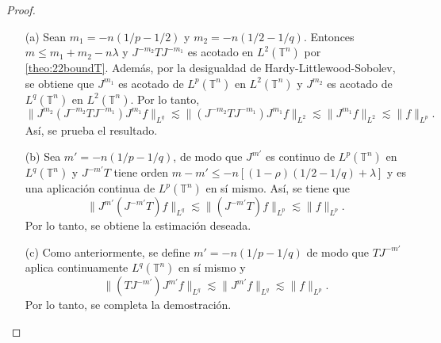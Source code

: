 \begin{proof}
	\begin{itemize}
		\item[(a)] Sean $m_1 = -n(1/p - 1/2)$ y $m_2=-n(1/2 - 1/q)$. Entonces $m\leq m_1+m_2-n\lambda$ y $J^{-m_2}TJ^{-m_1}$ es acotado en $L^2(\mathbb{T}^n)$ por \cref{theo:22boundT}. Además, por la desigualdad de Hardy-Littlewood-Sobolev, se obtiene que $J^{m_1}$ es acotado de $L^p(\mathbb{T}^n)$ en $L^2(\mathbb{T}^n)$ y $J^{m_2}$ es acotado de $L^q(\mathbb{T}^n)$ en $L^2(\mathbb{T}^n)$. Por lo tanto, 
		\begin{equation*}
			\| J^{m_2}(J^{-m_2}TJ^{-m_1})J^{m_1}f \|_{L^q} \lesssim \|(J^{-m_2}TJ^{-m_1})J^{m_1}f  \|_{L^2} \lesssim \| J^{m_1}f \|_{L^2} \lesssim  \| f\|_{L^p}.
		\end{equation*}
		Así, se prueba el resultado.\\
		
		\item[(b)] Sea $m' = -n(1/p - 1/q)$, de modo que $J^{m'}$ es continuo de  $L^p(\mathbb{T}^n)$ en $L^q(\mathbb{T}^n)$ y $J^{-m'}T$ tiene orden $m-m' \leq -n[(1-\rho)(1/2 - 1/q) + \lambda]$ y es una aplicación continua de $L^p(\mathbb{T}^n)$ en sí mismo. Así, se tiene que
		\begin{equation*}
			\| J^{m'}(J^{-m'}T)f \|_{L^q} \lesssim \|(J^{-m'}T)f\|_{L^p} \lesssim \|f\|_{L^p}.
		\end{equation*}
		Por lo tanto, se obtiene la estimación deseada.\\
		
		\item[(c)] Como anteriormente, se define  $m' = -n(1/p - 1/q)$ de modo que $TJ^{-m'}$ aplica continuamente  $L^q(\mathbb{T}^n)$ en sí mismo y
		\begin{equation*}
			\|(TJ^{-m'})J^{m'}f\|_{L^q} \lesssim \|J^{m'}f\|_{L^q} \lesssim \|f\|_{L^p}.
		\end{equation*}
		Por lo tanto, se completa la demostración.
	\end{itemize}
\end{proof}
